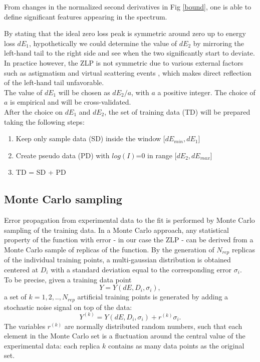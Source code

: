 \documentclass[11pt,a4paper]{article}
\numberwithin{equation}{section}
\numberwithin{figure}{section}
\numberwithin{table}{section}
\begin{document}
From changes in the normalized second derivatives in Fig \ref{bound}, one is able to define significant features appearing in the spectrum. 

By stating that the ideal zero loss peak is symmetric around zero up to energy loss $dE_1$, hypothetically we could determine the value of $dE_2$ by mirroring the left-hand tail to the right side and see when the two significantly start to deviate. In practice however, the ZLP is not symmetric due to various external factors such as astigmatism \cite{astigma} and virtual scattering events \cite{rafferty}, which makes direct reflection of the left-hand tail unfavorable. \\
The value of $dE_1$ will be chosen as $dE_2 / a$, with $a$ a positive integer. The choice of $a$ is empirical and will be cross-validated. \\ 

After the choice on $dE_1$ and $dE_2$, the set of training data (TD) will be prepared taking the following steps:
\begin{enumerate}
    \item Keep only sample data (SD) inside the window [$dE_{min}, dE_1$]
    \item Create pseudo data (PD) with $log(I)$=0 in range [$dE_2, dE_{max}$]
    \item TD = SD + PD
\end{enumerate}

\subsection{Monte Carlo sampling}
Error propagation from experimental data to the fit is performed by Monte Carlo sampling of the training data. In a Monte Carlo approach, any statistical property of the function with error - in our case the ZLP - can be derived from a Monte Carlo sample of replicas of the function. By the generation of $N_{rep}$ replicas of the individual training points, a multi-gaussian distribution is obtained centered at $D_i$ with a standard deviation equal to the corresponding error $\sigma_i$. \\
To be precise, given a training data point
\begin{equation}
    Y = Y(dE, D_i,\sigma_i), 
\end{equation} a set of $k= 1,2,..,N_{rep}$ artificial training points is generated by adding a stochastic noise signal on top of the data: 
\begin{equation}
    Y^{(k)} = Y(dE, D_i,\sigma_i) + r^{(k)}\sigma_i.
\end{equation}
The variables $r^{(k)}$ are normally distributed random numbers, such that each element in the Monte Carlo set is a fluctuation around the central value of the experimental data: each replica $k$ contains as many data points as the original set. \\
\end{document}
